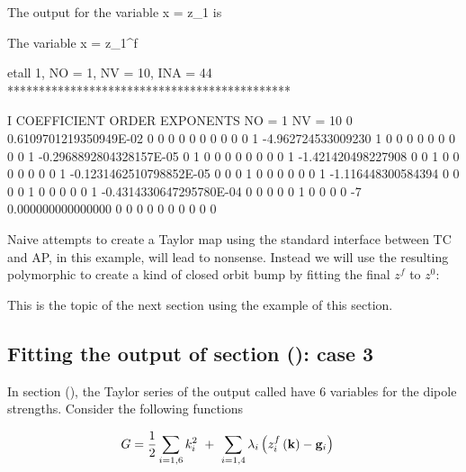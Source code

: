 \documentclass{hitec}     %
\begin{document}
{{{{{{ The output for the  variable x = z_1 is 

\begin{code}

 The variable x = z_1^f

 etall    1, NO =    1, NV =   10, INA =   44
 *********************************************

    I  COEFFICIENT          ORDER   EXPONENTS
      NO =     1      NV =    10
   0  0.6109701219350949E-02   0  0  0  0  0  0  0  0  0  0
   1  -4.962724533009230       1  0  0  0  0  0  0  0  0  0
   1 -0.2968892804328157E-05   0  1  0  0  0  0  0  0  0  0
   1  -1.421420498227908       0  0  1  0  0  0  0  0  0  0
   1 -0.1231462510798852E-05   0  0  0  1  0  0  0  0  0  0
   1  -1.116448300584394       0  0  0  0  1  0  0  0  0  0
   1 -0.4314330647295780E-04   0  0  0  0  0  1  0  0  0  0
    -7   0.000000000000000       0  0  0  0  0  0  0  0  0  0   
\end{code}
\renewcommand{\codefont}{\small}

Naive attempts to create a Taylor map using the standard interface between TC and AP, in this example, will  lead to nonsense. Instead we will use the resulting  polymorphic  to create a kind of closed orbit bump by fitting the final $z^f$ to $z^0$:



This is the topic of the next section using the  example of this section.

 \subsection{Fitting the output of section (\protect{}): case 3}\label{s:lagmap}

In section   (), the Taylor series of the output   called   have 6 variables for the dipole strengths. Consider the following functions 
 
%
\begin{align} G&={1 \over 2}\sum\limits_{i=
1,6}^{} {k}_{i}^{2}\ +\ \sum\limits_{i=
1,4}^{} {\lambda }_{i}\left({{z}_{i}^{f}\left({{\bf k}}\right) - {{\bf g}}_{i}}\right) \label{eq:lang}\end{align}


}}}}}}
\end{document}
